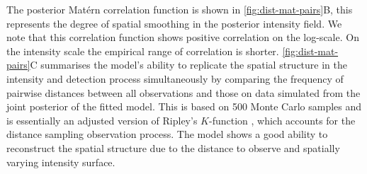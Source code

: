 \documentclass{statsoc}
\begin{document}
The posterior Mat\'ern correlation function is shown in \autoref{fig:dist-mat-pairs}B, this represents the degree of spatial smoothing in the posterior intensity field. We note that this correlation function shows positive correlation on the log-scale. On the intensity scale the empirical range of correlation is shorter.  \autoref{fig:dist-mat-pairs}C summarises the model's ability to replicate the spatial structure in the intensity and detection process simultaneously by comparing the frequency of pairwise distances between all observations and those on data simulated from the joint posterior of the fitted model.  This is based on 500 Monte Carlo samples and is essentially an adjusted version of Ripley's $K$-function \citep{ripley_SecondorderAnalysisStationary_1976}, which accounts for the distance sampling observation process.  The model shows a good ability to reconstruct the spatial structure due to the distance to observe and spatially varying intensity surface.
\end{document}

